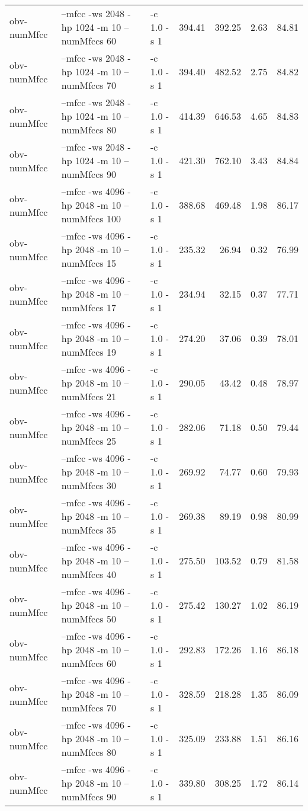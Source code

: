 \documentclass[11pt,a4paper]{article}
\begin{document}
\begin{tabular}{lllrrrr}
 obv-numMfcc   &  --mfcc -ws 2048 -hp 1024 -m 10 --numMfccs 60   &  -c 1.0 -s 1  &  394.41  &   392.25  &   2.63  &  84.81  \\
 obv-numMfcc   &  --mfcc -ws 2048 -hp 1024 -m 10 --numMfccs 70   &  -c 1.0 -s 1  &  394.40  &   482.52  &   2.75  &  84.82  \\
 obv-numMfcc   &  --mfcc -ws 2048 -hp 1024 -m 10 --numMfccs 80   &  -c 1.0 -s 1  &  414.39  &   646.53  &   4.65  &  84.83  \\
 obv-numMfcc   &  --mfcc -ws 2048 -hp 1024 -m 10 --numMfccs 90   &  -c 1.0 -s 1  &  421.30  &   762.10  &   3.43  &  84.84  \\
 obv-numMfcc   &  --mfcc -ws 4096 -hp 2048 -m 10 --numMfccs 100  &  -c 1.0 -s 1  &  388.68  &   469.48  &   1.98  &  86.17  \\
 obv-numMfcc   &  --mfcc -ws 4096 -hp 2048 -m 10 --numMfccs 15   &  -c 1.0 -s 1  &  235.32  &    26.94  &   0.32  &  76.99  \\
 obv-numMfcc   &  --mfcc -ws 4096 -hp 2048 -m 10 --numMfccs 17   &  -c 1.0 -s 1  &  234.94  &    32.15  &   0.37  &  77.71  \\
 obv-numMfcc   &  --mfcc -ws 4096 -hp 2048 -m 10 --numMfccs 19   &  -c 1.0 -s 1  &  274.20  &    37.06  &   0.39  &  78.01  \\
 obv-numMfcc   &  --mfcc -ws 4096 -hp 2048 -m 10 --numMfccs 21   &  -c 1.0 -s 1  &  290.05  &    43.42  &   0.48  &  78.97  \\
 obv-numMfcc   &  --mfcc -ws 4096 -hp 2048 -m 10 --numMfccs 25   &  -c 1.0 -s 1  &  282.06  &    71.18  &   0.50  &  79.44  \\
 obv-numMfcc   &  --mfcc -ws 4096 -hp 2048 -m 10 --numMfccs 30   &  -c 1.0 -s 1  &  269.92  &    74.77  &   0.60  &  79.93  \\
 obv-numMfcc   &  --mfcc -ws 4096 -hp 2048 -m 10 --numMfccs 35   &  -c 1.0 -s 1  &  269.38  &    89.19  &   0.98  &  80.99  \\
 obv-numMfcc   &  --mfcc -ws 4096 -hp 2048 -m 10 --numMfccs 40   &  -c 1.0 -s 1  &  275.50  &   103.52  &   0.79  &  81.58  \\
 obv-numMfcc   &  --mfcc -ws 4096 -hp 2048 -m 10 --numMfccs 50   &  -c 1.0 -s 1  &  275.42  &   130.27  &   1.02  &  86.19  \\
 obv-numMfcc   &  --mfcc -ws 4096 -hp 2048 -m 10 --numMfccs 60   &  -c 1.0 -s 1  &  292.83  &   172.26  &   1.16  &  86.18  \\
 obv-numMfcc   &  --mfcc -ws 4096 -hp 2048 -m 10 --numMfccs 70   &  -c 1.0 -s 1  &  328.59  &   218.28  &   1.35  &  86.09  \\
 obv-numMfcc   &  --mfcc -ws 4096 -hp 2048 -m 10 --numMfccs 80   &  -c 1.0 -s 1  &  325.09  &   233.88  &   1.51  &  86.16  \\
 obv-numMfcc   &  --mfcc -ws 4096 -hp 2048 -m 10 --numMfccs 90   &  -c 1.0 -s 1  &  339.80  &   308.25  &   1.72  &  86.14  \\
\end{tabular}
\end{document}
